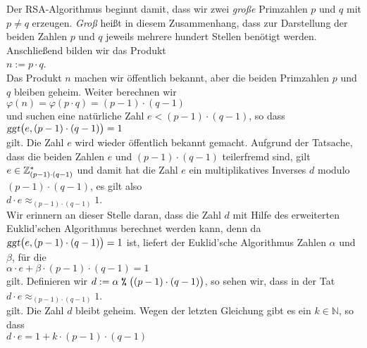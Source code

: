 Der RSA-Algorithmus beginnt damit, dass wir zwei \emph{große} Primzahlen $p$ und $q$ mit $p \not= q$
erzeugen.  \emph{Groß} heißt in diesem Zusammenhang, dass zur Darstellung der beiden Zahlen $p$ und $q$
jeweils mehrere hundert Stellen benötigt werden.  Anschließend bilden wir das Produkt
\\[0.2cm]
\hspace*{1.3cm}
$n := p \cdot q$.
\\[0.2cm]
Das Produkt $n$ machen wir öffentlich bekannt, aber die beiden Primzahlen $p$ und $q$ bleiben geheim.
Weiter berechnen wir
\\[0.2cm]
\hspace*{1.3cm}
$\varphi(n) = \varphi(p \cdot q) = (p-1) \cdot (q-1)$
\\[0.2cm]
und suchen eine natürliche Zahl $e < (p-1) \cdot (q-1)$, so dass 
\\[0.2cm]
\hspace*{1.3cm}
$\textsl{ggt}\bigl(e, (p-1) \cdot (q-1)\bigr) = 1$
\\[0.2cm]
gilt.  Die Zahl $e$ wird wieder öffentlich bekannt gemacht.
Aufgrund der Tatsache, dass die beiden Zahlen $e$ und $(p-1) \cdot (q-1)$
teilerfremd sind, gilt $e \in \mathbb{Z}_{(p-1) \cdot (q-1)}^*$ und damit hat die Zahl $e$ ein
multiplikatives Inverses $d$ modulo  $(p-1)\cdot(q-1)$, es gilt also
\\[0.2cm]
\hspace*{1.3cm}
$d \cdot e \approx_{(p-1)\cdot(q-1)} 1$.
\\[0.2cm]
Wir erinnern an dieser Stelle daran, dass die Zahl $d$ mit Hilfe des erweiterten Euklid'schen Algorithmus
berechnet werden kann, denn da $\textsl{ggt}\bigl(e, (p-1)\cdot(q-1)\bigr) = 1$ ist, liefert der
Euklid'sche Algorithmus Zahlen $\alpha$ und $\beta$, für die
\\[0.2cm]
\hspace*{1.3cm}
$\alpha \cdot e + \beta \cdot (p-1) \cdot (q-1) = 1$
\\[0.2cm]
gilt.  Definieren wir $d := \alpha \;\texttt{\%}\; \bigl((p-1) \cdot (q-1)\bigr)$, so sehen wir, dass in der Tat
\\[0.2cm]
\hspace*{1.3cm}
$d \cdot e \approx_{(p-1)\cdot(q-1)} 1$.
\\[0.2cm]
gilt.  Die Zahl $d$ bleibt geheim.
Wegen der letzten Gleichung gibt es ein $k \in \mathbb{N}$, so dass
\\[0.2cm]
\hspace*{1.3cm}
$d \cdot e = 1 + k \cdot (p-1) \cdot (q-1)$
\\[0.2cm]
